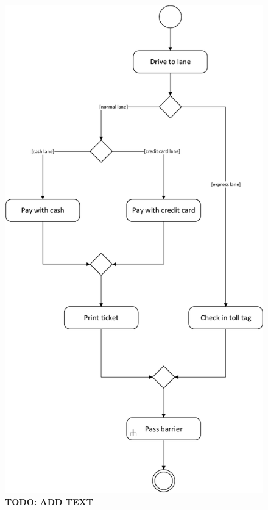 \begin{figure}
\centerline{\includegraphics[width=\textwidth]{img/activity_diagrams/Check_In}}
\caption{\textbf{TODO: ADD TEXT}}
\label{fig:activity_ci}
\end{figure}

